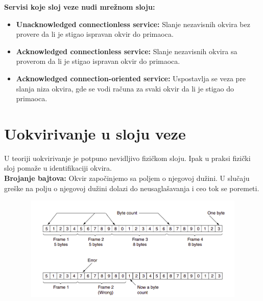 \documentclass[a4paper]{article}
\begin{document}
    \textbf{Servisi koje sloj veze nudi mrežnom sloju:}
    \begin{itemize}
        \item \textbf{Unacknowledged connectionless service: } Slanje nezavisnih okvira bez provere
              da li je stigao ispravan okvir do primaoca.
        \item \textbf{Acknowledged connectionless service: } Slanje nezavisnih okvira sa proverom
              da li je stigao ispravan okvir do primaoca.
        \item \textbf{Acknowledged connection-oriented service: } Uspostavlja se veza pre slanja niza
              okvira, gde se vodi računa za svaki okvir da li je stigao do primaoca.
    \end{itemize}

\section{Uokvirivanje u sloju veze}
    U teoriji uokvirivanje je potpuno nevidljivo fizičkom sloju. Ipak u praksi fizički sloj
    pomaže u identifikaciji okvira.\\
    
    \textbf{Brojanje bajtova:}  Okvir započinjemo sa poljem o njegovoj dužini. U slučaju greške na
    polju o njegovoj dužini dolazi do neusaglašavanja i ceo tok se poremeti.
    \begin{figure}[H]
        \begin{center}
            \includegraphics[width=120mm,height=50mm]{Slike/okvirivanje1.png}
        \end{center}
    \end{figure}
\end{document}
